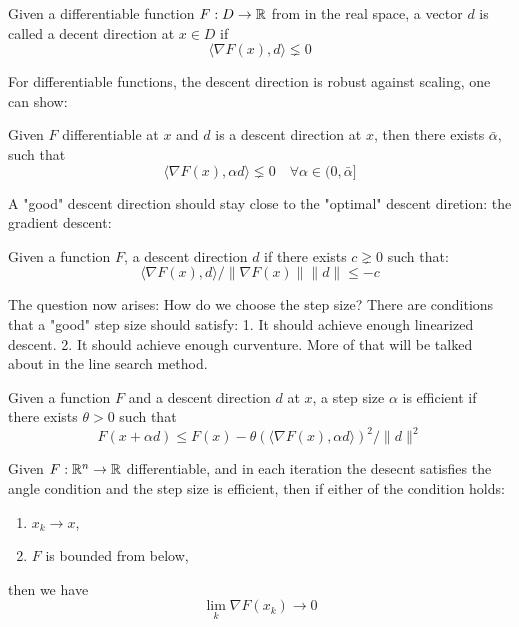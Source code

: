 \begin{definition}
	Given a differentiable function $F: D \rightarrow \mathbb{R}$ from in the real space, a vector $d$ is called a decent direction at $x \in D$ if 
	\[\langle \nabla F (x), d \rangle \lneq 0\]
\end{definition}

For differentiable functions, the descent direction is robust against scaling, one can show: 

\begin{theorem}
	Given $F$ differentiable at $x$ and $d$ is a descent direction at $x$, then there exists $\bar{\alpha}$, such that
	\[\langle \nabla F(x), \alpha d \rangle  \lneq 0 \quad \forall \alpha  \in (0, \bar{\alpha}] \]
\end{theorem}

A "good" descent direction should stay close to the "optimal" descent diretion: the gradient descent:
\begin{definition}
	Given a function $F$, a descent direction $d$ if there exists $c \gneq 0$ such that:
	\[
	\langle \nabla F(x), d \rangle / \|\nabla F(x)\| \|d\| \le -c
	\]
\end{definition}

The question now arises: How do we choose the step size? There are conditions that a "good" step size should satisfy: 
1. It should achieve enough linearized descent. 
2. It should achieve enough curventure. 
More of that will be talked about in the line search method. 

\begin{definition}
	Given a function $F$ and a descent direction $d$ at $x$, 
	a step size $\alpha$ is efficient if there exists $ \theta > 0$ such that
	\[ F(x + \alpha d) \le F(x) -  \theta (\langle \nabla F(x),  \alpha d \rangle)^2 / \|d\|^2  \]
\end{definition}

\begin{theorem}
	Given $F : \mathbb{R}^n \rightarrow \mathbb{R}$ differentiable, and in each iteration the desecnt 
	satisfies the angle condition and the step size is efficient, then if either of 
	the condition holds:
	\begin{enumerate}
		\item $x_k \rightarrow x$,
		\item $F$ is bounded from below,
	\end{enumerate}
	then we have
	\[
	\lim_k \nabla F(x_k) \rightarrow 0
	\]
\end{theorem}

